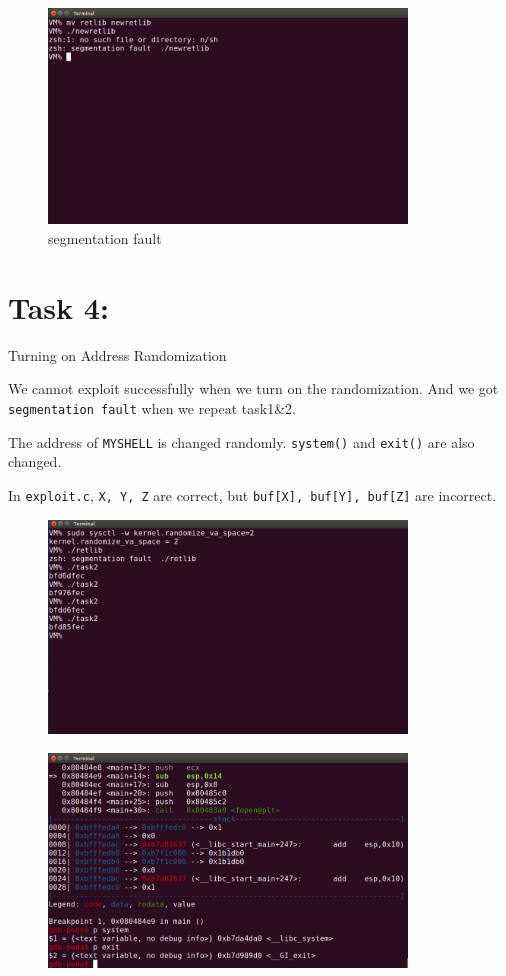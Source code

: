 \documentclass[onecolumn,oneside]{SUSTechHomework}
\begin{document}
  \begin{figure}[H]
    \centering
    \includegraphics[width=0.85\textwidth]{img/task3_7.png}
    \caption{segmentation fault}
  \end{figure}

  \section*{Task 4:}
  Turning on Address Randomization

  We cannot exploit successfully when we turn on the randomization. And we got \verb|segmentation fault| when we repeat task1\&2.

  The address of \verb|MYSHELL| is changed randomly. \verb|system()| and \verb|exit()| are also changed.

  In \verb|exploit.c|, \verb|X, Y, Z| are correct, but \verb|buf[X], buf[Y], buf[Z]| are incorrect.
  
  \begin{figure}[H]
    \centering
    \includegraphics[width=0.85\textwidth]{img/task4_1.png}
  \end{figure}

  \begin{figure}[H]
    \centering
    \includegraphics[width=0.85\textwidth]{img/task4_2.png}
  \end{figure}
\end{document}
